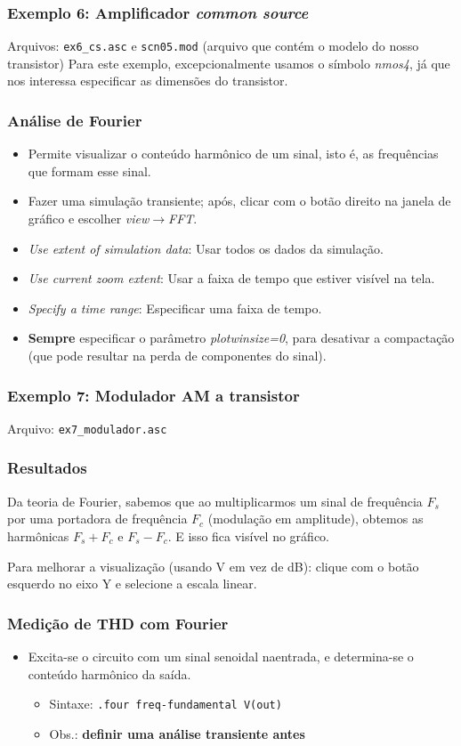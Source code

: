 \documentclass{beamer}
\begin{document}
\begin{frame}
\frametitle{Exemplo 6: Amplificador \textit{common source}}
Arquivos: \texttt{ex6\_cs.asc} e \texttt{scn05.mod} (arquivo que contém o modelo do nosso transistor)
Para este exemplo, excepcionalmente usamos o símbolo \textit{nmos4}, já que nos interessa especificar as dimensões do transistor.
\end{frame}

\begin{frame}
\frametitle{Análise de Fourier}
\begin{itemize}
\item Permite visualizar o conteúdo harmônico de um sinal, isto é, as frequências que formam esse sinal.
\item Fazer uma simulação transiente; após, clicar com o botão direito na janela de gráfico e escolher \textit{view}$\rightarrow$\textit{FFT}.
\item \textit{Use extent of simulation data}: Usar todos os dados da simulação.
\item \textit{Use current zoom extent}: Usar a faixa de tempo que estiver visível na tela.
\item \textit{Specify a time range}: Especificar uma faixa de tempo.
\item \textbf{Sempre} especificar o parâmetro \textit{plotwinsize=0}, para desativar a compactação (que pode resultar na perda de componentes do sinal).
\end{itemize}
\end{frame}

\begin{frame}
\frametitle{Exemplo 7: Modulador AM a transistor}
Arquivo: \texttt{ex7\_modulador.asc}
\end{frame}

\begin{frame}
\frametitle{Resultados}
Da teoria de Fourier, sabemos que ao multiplicarmos um sinal de frequência $F_s$ por uma portadora de frequência $F_c$ (modulação em amplitude), obtemos as harmônicas $F_s + F_c$ e $F_s - F_c$. E isso fica visível no gráfico.

Para melhorar a visualização (usando V em vez de dB): clique com o botão esquerdo no eixo Y e selecione a escala linear.
\end{frame}

\begin{frame}
\frametitle{Medição de THD com Fourier}
\begin{itemize}
\item Excita-se o circuito com um sinal senoidal naentrada, e determina-se o conteúdo harmônico da saída.
\begin{itemize}
\item Sintaxe: \texttt{.four freq-fundamental V(out)}
\item Obs.: \textbf{definir uma análise transiente antes}
\end{itemize}
\end{itemize}
\end{frame}
\end{document}
